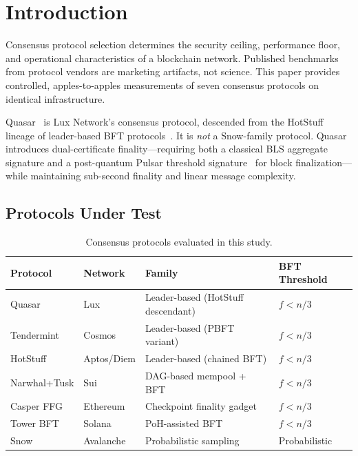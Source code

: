 \section{Introduction}


Consensus protocol selection determines the security ceiling, performance floor, and
operational characteristics of a blockchain network. Published benchmarks from protocol
vendors are marketing artifacts, not science. This paper provides controlled,
apples-to-apples measurements of seven consensus protocols on identical infrastructure.

Quasar~\cite{quasar-paper} is Lux Network's consensus protocol, descended from the
HotStuff lineage of leader-based BFT protocols~\cite{hotstuff}. It is \emph{not} a
Snow-family protocol. Quasar introduces dual-certificate finality---requiring both
a classical BLS aggregate signature and a post-quantum Pulsar threshold
signature~\cite{pulsar} for block finalization---while maintaining sub-second
finality and linear message complexity.

\subsection{Protocols Under Test}

\begin{table}[h]
\centering
\small
\begin{tabular}{@{}llll@{}}
\toprule
\textbf{Protocol} & \textbf{Network} & \textbf{Family} & \textbf{BFT Threshold} \\
\midrule
Quasar        & Lux         & Leader-based (HotStuff descendant) & $f < n/3$ \\
Tendermint    & Cosmos      & Leader-based (PBFT variant)        & $f < n/3$ \\
HotStuff      & Aptos/Diem  & Leader-based (chained BFT)         & $f < n/3$ \\
Narwhal+Tusk  & Sui         & DAG-based mempool + BFT            & $f < n/3$ \\
Casper FFG    & Ethereum    & Checkpoint finality gadget         & $f < n/3$ \\
Tower BFT     & Solana      & PoH-assisted BFT                   & $f < n/3$ \\
Snow          & Avalanche   & Probabilistic sampling             & Probabilistic \\
\bottomrule
\end{tabular}
\caption{Consensus protocols evaluated in this study.}
\label{tab:protocols}
\end{table}

